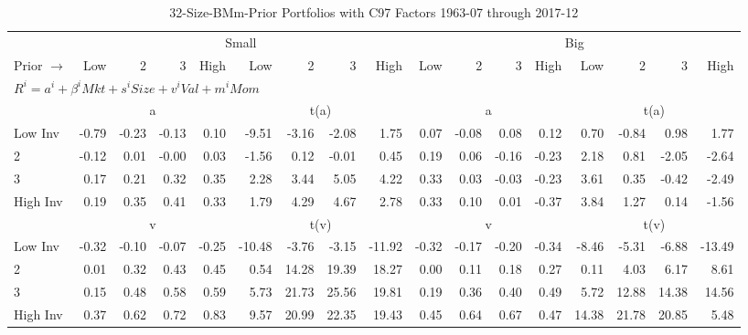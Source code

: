 
\begin{table}[!ht]
\footnotesize
\centering
\caption{32-Size-BMm-Prior Portfolios with C97 Factors 1963-07 through 2017-12}
\begin{tabular}{lrrrrrrrrrrrrrrrr}
  \toprule
    & \multicolumn{8}{c}{Small} & \multicolumn{8}{c}{Big} \\
      \cmidrule(r){2-9} \cmidrule(r){10-17}
    Prior $\rightarrow$ & Low & 2 & 3 & High & Low & 2 & 3 & High & Low & 2 & 3 & High & Low & 2 & 3 & High \\ 
  \midrule
  \multicolumn{17}{l}{$R^i=a^i+\beta^iMkt+s^iSize+v^iVal+m^iMom$} \\

  
    
      & \multicolumn{4}{c}{a} & \multicolumn{4}{c}{t(a)}
    
      & \multicolumn{4}{c}{a} & \multicolumn{4}{c}{t(a)}
    
    \\
      \cmidrule(r){2-5} \cmidrule(r){6-9} \cmidrule(r){10-13} \cmidrule(r){14-17}

    Low Inv   & -0.79  & -0.23  & -0.13  & 0.10  & -9.51  & -3.16  & -2.08  & 1.75  & 0.07  & -0.08  & 0.08  & 0.12  & 0.70  & -0.84  & 0.98  & 1.77  \\
           2  & -0.12  & 0.01  & -0.00  & 0.03  & -1.56  & 0.12  & -0.01  & 0.45  & 0.19  & 0.06  & -0.16  & -0.23  & 2.18  & 0.81  & -2.05  & -2.64  \\
           3  & 0.17  & 0.21  & 0.32  & 0.35  & 2.28  & 3.44  & 5.05  & 4.22  & 0.33  & 0.03  & -0.03  & -0.23  & 3.61  & 0.35  & -0.42  & -2.49  \\
    High Inv  & 0.19  & 0.35  & 0.41  & 0.33  & 1.79  & 4.29  & 4.67  & 2.78  & 0.33  & 0.10  & 0.01  & -0.37  & 3.84  & 1.27  & 0.14  & -1.56  \\

  
    
      & \multicolumn{4}{c}{v} & \multicolumn{4}{c}{t(v)}
    
      & \multicolumn{4}{c}{v} & \multicolumn{4}{c}{t(v)}
    
    \\
      \cmidrule(r){2-5} \cmidrule(r){6-9} \cmidrule(r){10-13} \cmidrule(r){14-17}

    Low Inv   & -0.32  & -0.10  & -0.07  & -0.25  & -10.48  & -3.76  & -3.15  & -11.92  & -0.32  & -0.17  & -0.20  & -0.34  & -8.46  & -5.31  & -6.88  & -13.49  \\
           2  & 0.01  & 0.32  & 0.43  & 0.45  & 0.54  & 14.28  & 19.39  & 18.27  & 0.00  & 0.11  & 0.18  & 0.27  & 0.11  & 4.03  & 6.17  & 8.61  \\
           3  & 0.15  & 0.48  & 0.58  & 0.59  & 5.73  & 21.73  & 25.56  & 19.81  & 0.19  & 0.36  & 0.40  & 0.49  & 5.72  & 12.88  & 14.38  & 14.56  \\
    High Inv  & 0.37  & 0.62  & 0.72  & 0.83  & 9.57  & 20.99  & 22.35  & 19.43  & 0.45  & 0.64  & 0.67  & 0.47  & 14.38  & 21.78  & 20.85  & 5.48  \\


\end{tabular}
\end{table}
